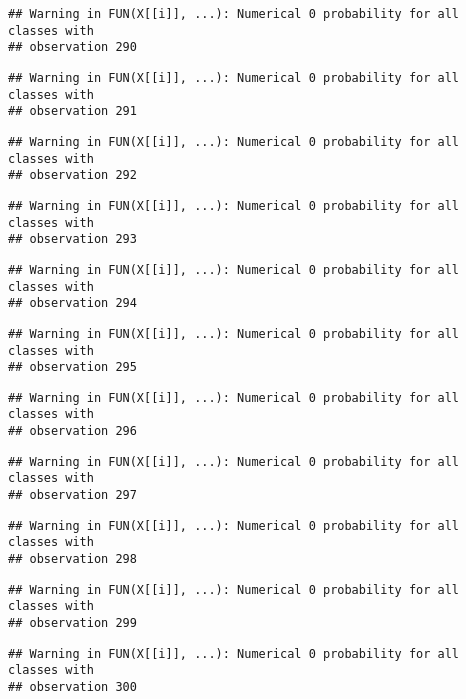 \documentclass[
]{article}
\begin{document}
\begin{verbatim}
## Warning in FUN(X[[i]], ...): Numerical 0 probability for all classes with
## observation 290
\end{verbatim}

\begin{verbatim}
## Warning in FUN(X[[i]], ...): Numerical 0 probability for all classes with
## observation 291
\end{verbatim}

\begin{verbatim}
## Warning in FUN(X[[i]], ...): Numerical 0 probability for all classes with
## observation 292
\end{verbatim}

\begin{verbatim}
## Warning in FUN(X[[i]], ...): Numerical 0 probability for all classes with
## observation 293
\end{verbatim}

\begin{verbatim}
## Warning in FUN(X[[i]], ...): Numerical 0 probability for all classes with
## observation 294
\end{verbatim}

\begin{verbatim}
## Warning in FUN(X[[i]], ...): Numerical 0 probability for all classes with
## observation 295
\end{verbatim}

\begin{verbatim}
## Warning in FUN(X[[i]], ...): Numerical 0 probability for all classes with
## observation 296
\end{verbatim}

\begin{verbatim}
## Warning in FUN(X[[i]], ...): Numerical 0 probability for all classes with
## observation 297
\end{verbatim}

\begin{verbatim}
## Warning in FUN(X[[i]], ...): Numerical 0 probability for all classes with
## observation 298
\end{verbatim}

\begin{verbatim}
## Warning in FUN(X[[i]], ...): Numerical 0 probability for all classes with
## observation 299
\end{verbatim}

\begin{verbatim}
## Warning in FUN(X[[i]], ...): Numerical 0 probability for all classes with
## observation 300
\end{verbatim}
\end{document}
